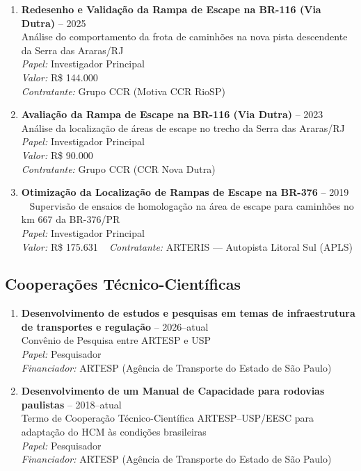 \documentclass[
  brazilian,
  11pt,
  a4paper,
]{article}
\begin{document}
\begin{enumerate}
\def\labelenumi{\arabic{enumi}.}
\item
  \textbf{Redesenho e Validação da Rampa de Escape na BR-116 (Via
  Dutra)} -- 2025\\
  Análise do comportamento da frota de caminhões na nova pista
  descendente da Serra das Araras/RJ\\
  \emph{Papel:} Investigador Principal\\
  \emph{Valor:} R\$ 144.000\\
  \emph{Contratante:} Grupo CCR (Motiva CCR RioSP)
\item
  \textbf{Avaliação da Rampa de Escape na BR-116 (Via Dutra)} -- 2023\\
  Análise da localização de áreas de escape no trecho da Serra das
  Araras/RJ\\
  \emph{Papel:} Investigador Principal\\
  \emph{Valor:} R\$ 90.000\\
  \emph{Contratante:} Grupo CCR (CCR Nova Dutra)
\item
  \textbf{Otimização da Localização de Rampas de Escape na BR-376} --
  2019 ~ Supervisão de ensaios de homologação na área de escape para
  caminhões no km 667 da BR-376/PR\\
  \emph{Papel:} Investigador Principal\\
  \emph{Valor:} R\$ 175.631 ~ \emph{Contratante:} ARTERIS --- Autopista
  Litoral Sul (APLS)
\end{enumerate}

\subsection{Cooperações
Técnico-Científicas}\label{cooperauxe7uxf5es-tuxe9cnico-cientuxedficas}

\begin{enumerate}
\def\labelenumi{\arabic{enumi}.}
\item
  \textbf{Desenvolvimento de estudos e pesquisas em temas de
  infraestrutura de transportes e regulação} -- 2026--atual\\
  Convênio de Pesquisa entre ARTESP e USP\\
  \emph{Papel:} Pesquisador\\
  \emph{Financiador:} ARTESP (Agência de Transporte do Estado de São
  Paulo)
\item
  \textbf{Desenvolvimento de um Manual de Capacidade para rodovias
  paulistas} -- 2018--atual\\
  Termo de Cooperação Técnico-Científica ARTESP--USP/EESC para adaptação
  do HCM às condições brasileiras\\
  \emph{Papel:} Pesquisador\\
  \emph{Financiador:} ARTESP (Agência de Transporte do Estado de São
  Paulo)
\end{enumerate}
\end{document}

